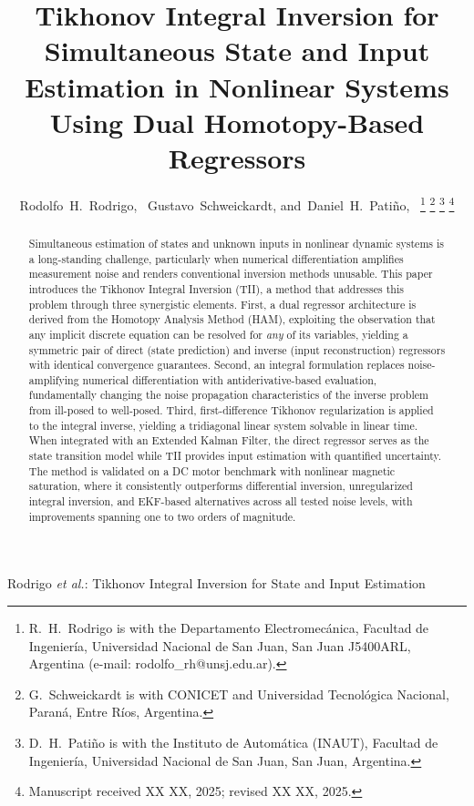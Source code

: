 \documentclass[lettersize,journal]{IEEEtran}
\begin{document}
\title{Tikhonov Integral Inversion for Simultaneous State and Input Estimation in Nonlinear Systems Using Dual Homotopy-Based Regressors}

\author{Rodolfo~H.~Rodrigo,~
        Gustavo~Schweickardt,
        and~Daniel~H.~Pati\~no,~
\thanks{R.~H.~Rodrigo is with the Departamento Electromec\'anica, Facultad de Ingenier\'ia, Universidad Nacional de San Juan, San Juan J5400ARL, Argentina (e-mail: rodolfo\_rh@unsj.edu.ar).}
\thanks{G.~Schweickardt is with CONICET and Universidad Tecnol\'ogica Nacional, Paran\'a, Entre R\'ios, Argentina.}
\thanks{D.~H.~Pati\~no is with the Instituto de Autom\'atica (INAUT), Facultad de Ingenier\'ia, Universidad Nacional de San Juan, San Juan, Argentina.}
\thanks{Manuscript received XX XX, 2025; revised XX XX, 2025.}}

%
{Rodrigo \MakeLowercase{\textit{et al.}}: Tikhonov Integral Inversion for State and Input Estimation}

\maketitle

\begin{abstract}
Simultaneous estimation of states and unknown inputs in nonlinear dynamic systems is a long-standing challenge, particularly when numerical differentiation amplifies measurement noise and renders conventional inversion methods unusable. This paper introduces the Tikhonov Integral Inversion (TII), a method that addresses this problem through three synergistic elements. First, a dual regressor architecture is derived from the Homotopy Analysis Method (HAM), exploiting the observation that any implicit discrete equation can be resolved for \emph{any} of its variables, yielding a symmetric pair of direct (state prediction) and inverse (input reconstruction) regressors with identical convergence guarantees. Second, an integral formulation replaces noise-amplifying numerical differentiation with antiderivative-based evaluation, fundamentally changing the noise propagation characteristics of the inverse problem from ill-posed to well-posed. Third, first-difference Tikhonov regularization is applied to the integral inverse, yielding a tridiagonal linear system solvable in linear time. When integrated with an Extended Kalman Filter, the direct regressor serves as the state transition model while TII provides input estimation with quantified uncertainty. The method is validated on a DC motor benchmark with nonlinear magnetic saturation, where it consistently outperforms differential inversion, unregularized integral inversion, and EKF-based alternatives across all tested noise levels, with improvements spanning one to two orders of magnitude.
\end{abstract}
\end{document}
